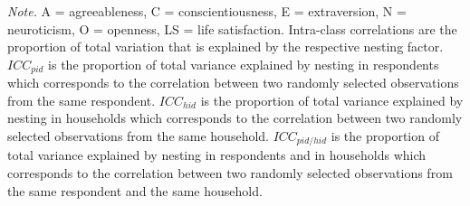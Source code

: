 \documentclass[
  english,
  man,floatsintext]{apa7}
\begin{document}
\begin{table}[h]
\begin{center}
\begin{threeparttable}
\begin{tablenotes}[para]
\normalsize{\textit{Note.} A = agreeableness, C = conscientiousness, E = extraversion, N = neuroticism, O = openness, LS = life satisfaction. Intra-class correlations are the proportion of total variation that is explained by the respective nesting factor. $ICC_{pid}$ is the proportion of total variance explained by nesting in respondents which corresponds to the correlation between two randomly selected observations from the same respondent. $ICC_{hid}$ is the proportion of total variance explained by nesting in households which corresponds to the correlation between two randomly selected observations from the same household. $ICC_{pid/hid}$ is the proportion of total variance explained by nesting in respondents and in households which corresponds to the correlation between two randomly selected observations from the same respondent and the same household.}
\end{tablenotes}

\end{threeparttable}
\end{center}

\end{table}
\end{document}
